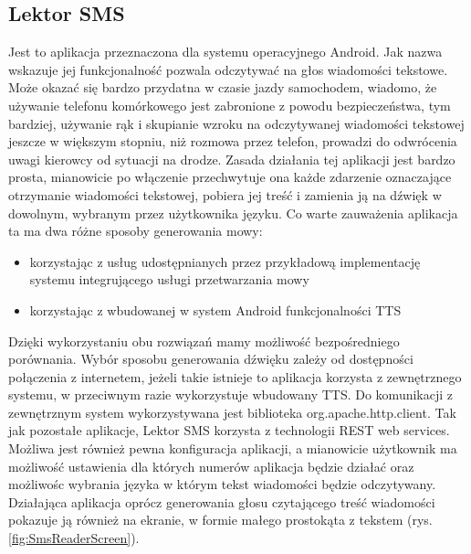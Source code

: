 \subsection{Lektor SMS}
Jest to aplikacja przeznaczona dla systemu operacyjnego Android. Jak nazwa wskazuje jej funkcjonalność pozwala odczytywać na głos wiadomości tekstowe. Może okazać się bardzo przydatna w czasie jazdy samochodem, wiadomo, że używanie telefonu komórkowego jest zabronione z powodu bezpieczeństwa, tym bardziej, używanie rąk i skupianie wzroku na odczytywanej wiadomości tekstowej jeszcze w większym stopniu, niż rozmowa przez telefon, prowadzi do odwrócenia uwagi kierowcy od sytuacji na drodze.
Zasada działania tej aplikacji jest bardzo prosta, mianowicie po włączenie przechwytuje ona każde zdarzenie oznaczające otrzymanie wiadomości tekstowej, pobiera jej treść i zamienia ją na dźwięk w dowolnym, wybranym przez użytkownika języku. Co warte zauważenia aplikacja ta ma dwa różne sposoby generowania mowy:
\begin{itemize}
	\item korzystając z usług udostępnianych przez przykładową implementację systemu integrującego usługi przetwarzania mowy
	\item korzystając z wbudowanej w system Android funkcjonalności TTS
\end{itemize} 
Dzięki wykorzystaniu obu rozwiązań mamy możliwość bezpośredniego porównania. Wybór sposobu generowania dźwięku zależy od dostępności połączenia z internetem, jeżeli takie istnieje to aplikacja korzysta z zewnętrznego systemu, w przeciwnym razie wykorzystuje wbudowany TTS. Do komunikacji z zewnętrznym system wykorzystywana jest biblioteka org.apache.http.client. Tak jak pozostałe aplikacje, Lektor SMS korzysta z technologii REST web services. Możliwa jest również pewna konfiguracja aplikacji, a mianowicie użytkownik ma możliwość ustawienia dla których numerów aplikacja będzie działać oraz możliwośc wybrania języka w którym tekst wiadomości będzie odczytywany. Działająca aplikacja oprócz generowania głosu czytającego treść wiadomości pokazuje ją również na ekranie, w formie małego prostokąta z tekstem (rys. \ref{fig:SmsReaderScreen}).
